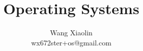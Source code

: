 \usepackage{wx672tut}






\AtBeginPart{\frame{\partpage}}

\title{Operating Systems}
\author{Wang Xiaolin\\{\small\ttfamily wx672ster+os@gmail.com}}

